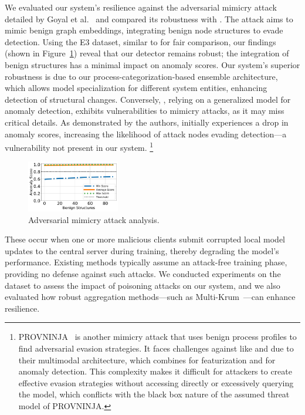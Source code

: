   We evaluated our system's resilience against the adversarial mimicry attack detailed by Goyal et al.~\cite{goyal2023sometimes} and compared its robustness with \flash. The attack aims to mimic benign graph embeddings, integrating benign node structures to evade detection. Using the E3 dataset, similar to \flash for fair comparison, our findings (shown in Figure~\ref{mimicryattack}) reveal that our detector remains robust; the integration of benign structures has a minimal impact on anomaly scores. Our system's superior robustness is due to our process-categorization-based ensemble \gnnshort architecture, which allows model specialization for different system entities, enhancing detection of structural changes. Conversely, \flash, relying on a generalized model for anomaly detection, exhibits vulnerabilities to mimicry attacks, as it may miss critical details. As demonstrated by the authors, \flash initially experiences a drop in anomaly scores, increasing the likelihood of attack nodes evading detection—a vulnerability not present in our system. \footnote{PROVNINJA~\cite{mukherjee2023evading} is another mimicry attack that uses benign process profiles to find adversarial evasion strategies. It faces challenges against \pids like \flash and \Sys due to their multimodal architecture, which combines \wordvec for featurization and \gnnshort for anomaly detection. This complexity makes it difficult for attackers to create effective evasion strategies without accessing \wordvec directly or excessively querying the model, which conflicts with the black box nature of the assumed threat model of PROVNINJA.}

\begin{figure}[!t]
    \centering
    \includegraphics[width=0.36\textwidth]{fig/adversarial.pdf}
    \caption{Adversarial mimicry attack analysis. }
    \label{mimicryattack}
    \vspace{-2ex}
  \end{figure}


 These occur when one or more malicious clients submit corrupted local model updates to the central server during training, thereby degrading the model’s performance. Existing methods typically assume an attack-free training phase, providing no defense against such attacks. We conducted experiments on the \optc dataset to assess the impact of poisoning attacks on our system, and we also evaluated how robust aggregation methods—such as Multi-Krum~\cite{munoz2019byzantine}—can enhance resilience.

